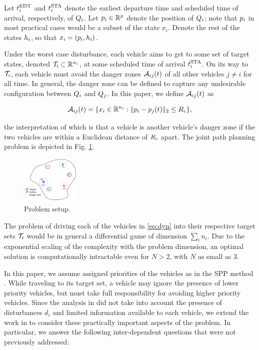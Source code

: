 Let $t^\text{EDT}_i$ and $t^\text{STA}_i$ denote the earliest departure time and scheduled time of arrival, respectively, of $Q_i$. Let $p_i \in \mathbb{R}^p$ denote the position of $Q_i$; note that $p_i$ in most practical cases would be a subset of the state $x_i$. Denote the rest of the states $h_i$, so that $x_i = (p_i, h_i)$. 

Under the worst case disturbance, each vehicle aims to get to some set of target states, denoted $\mathcal{T}_i \subset \mathbb{R}^{n_i}$, at some scheduled time of arrival $t^\text{STA}_i$. On its way to $\mathcal{T}_i$, each vehicle must avoid the danger zones $\mathcal{A}_{ij}(t)$ of all other vehicles $j\neq i$ for all time. In general, the danger zone can be defined to capture any undesirable configuration between $Q_i$ and $Q_j$. In this paper, we define $\mathcal{A}_{ij}(t)$ as

\vspace{-0.5em} 
\begin{equation}
\mathcal{A}_{ij}(t) = \{x_i \in \mathbb{R}^{n_i}: \|p_i - p_j(t)\|_2 \le R_c \},
\end{equation}

\noindent the interpretation of which is that a vehicle is another vehicle's danger zone if the two vehicles are within a Euclidean distance of $R_c$ apart. The joint path planning problem is depicted in Fig. \ref{fig:form}.

\begin{figure}[h]
  \centering
  \includegraphics[width=0.25\textwidth]{"fig/formulation"}
  \caption{Problem setup.}
  \label{fig:form}
  \vspace{-1.5em}
\end{figure}
 
The problem of driving each of the vehicles in \eqref{eq:dyn} into their respective target sets $\mathcal{T}_i$ would be in general a differential game of dimension $\sum_i n_i$. Due to the exponential scaling of the complexity with the problem dimension, an optimal solution is computationally intractable even for $N>2$, with $N$ as small as $3$. 

In this paper, we assume assigned priorities of the vehicles as in the SPP method \cite{Chen15}. While traveling to its target set, a vehicle may ignore the presence of lower priority vehicles, but must take full responsibility for avoiding higher priority vehicles. Since the analysis in \cite{Chen15} did not take into account the presence of disturbances $d_i$ and limited information available to each vehicle, we extend the work in \cite{Chen15} to consider these practically important aspects of the problem. In particular, we answer the following inter-dependent questions that were not previously addressed:

